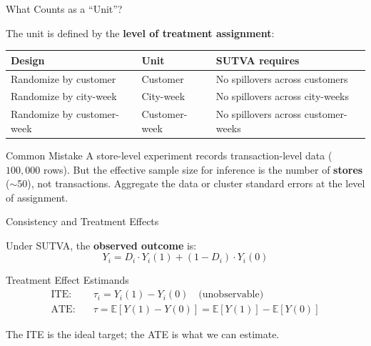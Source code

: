 \documentclass[aspectratio=169, 11pt, handout]{beamer}
\newcommand{\E}{\mathbb{E}}
\begin{document}
\begin{frame}{What Counts as a ``Unit''?}

The unit is defined by the \textbf{level of treatment assignment}:

\bigskip

\begin{center}
\small
\begin{tabular}{lll}
\toprule
\textbf{Design} & \textbf{Unit} & \textbf{SUTVA requires} \\
\midrule
Randomize by customer & Customer & No spillovers across customers \\
Randomize by city-week & City-week & No spillovers across city-weeks \\
Randomize by customer-week & Customer-week & No spillovers across customer-weeks \\
\bottomrule
\end{tabular}
\end{center}

\bigskip

\begin{alertblock}{Common Mistake}
A store-level experiment records transaction-level data ($100{,}000$ rows). But the effective sample size for inference is the number of \textbf{stores} ($\sim$50), not transactions. Aggregate the data or cluster standard errors at the level of assignment.
\end{alertblock}
\end{frame}

\begin{frame}{Consistency and Treatment Effects}

Under SUTVA, the \textbf{observed outcome} is:
\[
Y_i = D_i \cdot Y_i(1) + (1 - D_i) \cdot Y_i(0)
\]

\bigskip

\begin{block}{Treatment Effect Estimands}
\begin{align*}
\text{ITE:} \quad & \tau_i = Y_i(1) - Y_i(0) \quad \text{(unobservable)} \\[0.5em]
\text{ATE:} \quad & \tau = \E[Y(1) - Y(0)] = \E[Y(1)] - \E[Y(0)]
\end{align*}
\end{block}

\bigskip

The ITE is the ideal target; the ATE is what we can estimate.
\end{frame}
\end{document}
